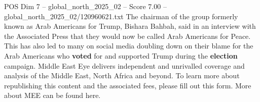 \begin{textsample}{POS Dim 7 – global\_north\_2025\_02 – Score 7.00 – global\_north\_2025\_02/120960621.txt}
The chairman of the group formerly known as Arab Americans for Trump, Bishara Bahbah, said in an interview with the Associated Press that they would now be called Arab Americans for Peace.
This has also led to many on social media doubling down on their blame for the Arab Americans who \textbf{voted} for and supported Trump during the \textbf{election} campaign.
Middle East Eye delivers independent and unrivalled coverage and analysis of the Middle East, North Africa and beyond.
To learn more about republishing this content and the associated fees, please fill out this form.
More about MEE can be found here.

\end{textsample}
